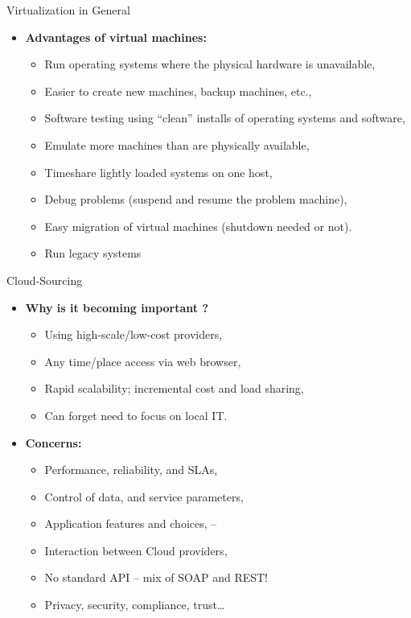 \documentclass{SKP-beamer}
\begin{document}
\begin{frame}{Virtualization in General}
	\begin{itemize}
		
		\item  \textbf{Advantages of virtual machines:}
		\begin{itemize}
			\item  Run operating systems where the physical hardware is unavailable,
			\item  Easier to create new machines, backup machines, etc.,
			\item Software testing using “clean” installs of operating systems and software,
			\item  Emulate more machines than are physically available,
			\item  Timeshare lightly loaded systems on one host,
			\item  Debug problems (suspend and resume the problem machine),
			\item  Easy migration of virtual machines (shutdown needed or not).
			\item  Run legacy systems
			
			
		\end{itemize}
	\end{itemize}
\end{frame}


\begin{frame}{Cloud-Sourcing}
	\begin{itemize}
		
		\item  \textbf{Why is it becoming important ?}
		\begin{itemize}
			\item  Using high-scale/low-cost providers,
			\item  Any time/place access via web browser,
			\item  Rapid scalability; incremental cost and load sharing,
			\item  Can forget need to focus on local IT.
		\end{itemize}
		\item  \textbf{Concerns:}
		\begin{itemize}
			\item  Performance, reliability, and SLAs,
			\item  Control of data, and service parameters,
			\item  Application features and choices,
			–\item Interaction between Cloud providers,
			\item  No standard API – mix of SOAP and REST!
			\item  Privacy, security, compliance, trust…
			
		\end{itemize}
	\end{itemize}
\end{frame}
\end{document}
